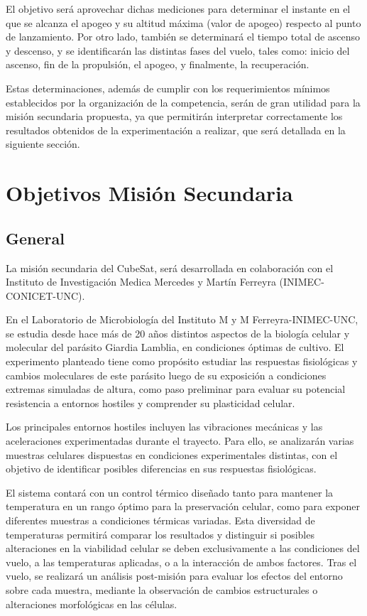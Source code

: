 El objetivo será aprovechar dichas mediciones para determinar el instante en el que se
alcanza el apogeo y su altitud máxima (valor de apogeo) respecto al punto de lanzamiento.
Por otro lado, también se determinará el tiempo total de ascenso y descenso, y se identificarán
las distintas fases del vuelo, tales como: inicio del ascenso, fin de la propulsión, el apogeo,
y finalmente, la recuperación.

Estas determinaciones, además de cumplir con los requerimientos mínimos establecidos por la
organización de la competencia, serán de gran utilidad para la misión secundaria propuesta,
ya que permitirán interpretar correctamente los resultados obtenidos de la experimentación
a realizar, que será detallada en la siguiente sección.

\section{Objetivos Misión Secundaria}
  \subsection{General}
    La misión secundaria del CubeSat, será desarrollada en colaboración con el Instituto de Investigación
    Medica Mercedes y Martín Ferreyra (INIMEC-CONICET-UNC).

    En el Laboratorio de Microbiología del Instituto M y M Ferreyra-INIMEC-UNC, se estudia desde hace más de 20 años
    distintos aspectos de la biología celular y molecular del parásito Giardia Lamblia, en condiciones óptimas de
    cultivo. El experimento planteado tiene como propósito estudiar las respuestas fisiológicas y cambios moleculares
    de este parásito luego de su exposición a condiciones extremas simuladas de altura, como paso preliminar para
    evaluar su potencial resistencia a entornos hostiles y comprender su plasticidad celular.

    Los principales entornos hostiles incluyen las vibraciones mecánicas y
    las aceleraciones experimentadas durante el trayecto. Para ello, se analizarán varias muestras
    celulares dispuestas en condiciones experimentales distintas, con el objetivo de identificar
    posibles diferencias en sus respuestas fisiológicas.

    El sistema contará con un control térmico diseñado tanto para mantener la temperatura en un rango óptimo para la
    preservación celular, como para exponer diferentes muestras a condiciones térmicas variadas. Esta diversidad de
    temperaturas permitirá comparar los resultados y distinguir si posibles alteraciones en la viabilidad celular se
    deben exclusivamente a las condiciones del vuelo, a las temperaturas aplicadas, o a la interacción de ambos factores.
    Tras el vuelo, se realizará un análisis post-misión para evaluar los efectos del entorno sobre cada muestra, mediante
    la observación de cambios estructurales o alteraciones morfológicas en las células.


